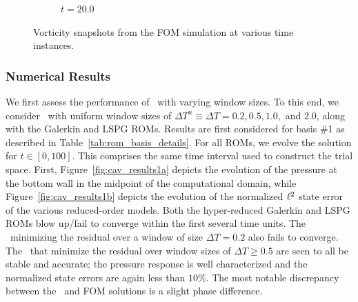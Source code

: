 \begin{figure}
\begin{center}
\begin{subfigure}[t]{0.49\textwidth}
\caption{$t=20.0$}
\end{subfigure}
\caption{Vorticity snapshots from the FOM simulation at various time instances.} 
\label{fig:fom_sols_cav}
\end{center}
\end{figure}


\subsubsection{Numerical Results}
We first assess the performance of \methodAcronymROMs\ with varying window sizes. To this end, we consider \methodAcronymROMs\ with uniform window 
sizes of $\Delta T^n \equiv \Delta T = 0.2,0.5,1.0,$ and $2.0$, along with the Galerkin and LSPG ROMs. Results are first considered for basis \#1 as described in 
Table~\ref{tab:rom_basis_details}. For all ROMs, we evolve 
the solution for $t \in [0,100]$. This comprises the same time interval used to construct the trial space. First, Figure~\ref{fig:cav_results1a} depicts the evolution of the pressure at the bottom wall in the midpoint of the computational domain, while Figure~\ref{fig:cav_results1b} depicts the evolution of the normalized $\ell^2$ state error of the various reduced-order models. Both the hyper-reduced Galerkin and LSPG ROMs blow up/fail to converge within the first several time units. The \methodAcronymROM\ minimizing the residual over a window of size $\Delta T = 0.2$ also fails to converge. The \methodAcronymROMs\ that minimize the residual over window sizes of $\Delta T \ge 0.5$ are seen to all be stable and accurate; the pressure response is well characterized and the normalized state errors are again less than $10\%$. The most notable discrepancy between the \methodAcronymROM\ and FOM solutions is a slight phase difference. 






